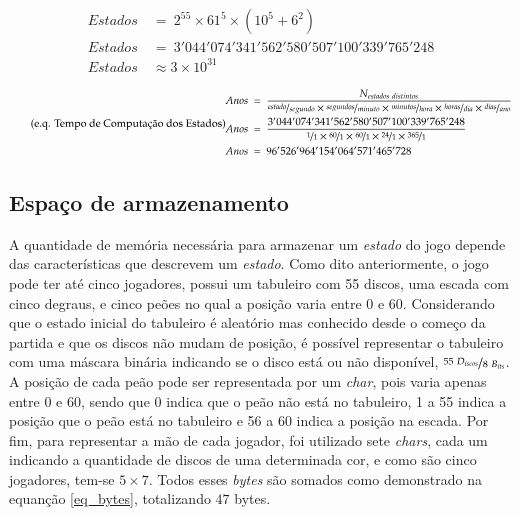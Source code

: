 \begin{equation} \label{eq_estados} \tag{e.q. Caso Geral}
\begin{split}
Estados\ &=\ 2^{55}\times 61^{5}\times (10^{5} + 6^{2})\\
Estados\ &=\ 3'044'074'341'562'580'507'100'339'765'248\\
Estados\ &\approx 3\times 10^{31}
\end{split}
\end{equation}

\begin{equation} \label{eq_anos_estados} \tag{e.q. Tempo de Computação dos Estados}
\begin{split}
Anos\ &=\ \dfrac{N_{estados\ distintos}}{\nicefrac{estado}{segundo}\times\nicefrac{segundos}{minuto}\times\nicefrac{minutos}{hora}\times\nicefrac{horas}{dia}\times\nicefrac{dias}{ano}}\\
Anos\ &=\ \dfrac{3'044'074'341'562'580'507'100'339'765'248}{\nicefrac{1}{1}\times\nicefrac{60}{1}\times\nicefrac{60}{1}\times\nicefrac{24}{1}\times\nicefrac{365}{1}}\\
Anos\ &=\ 96'526'964'154'064'571'465'728
\end{split}
\end{equation}

\subsection{Espaço de armazenamento}

A quantidade de memória necessária para armazenar um \emph{estado} do jogo depende das características que descrevem um \emph{estado}. Como dito anteriormente, o jogo pode ter até cinco jogadores, possui um tabuleiro com 55 discos, uma escada com cinco degraus, e cinco peões no qual a posição varia entre 0 e 60. Considerando que o estado inicial do tabuleiro é aleatório mas conhecido desde o começo da partida e que os discos não mudam de posição, é possível representar o tabuleiro com uma máscara binária indicando se o disco está ou não disponível, $\nicefrac{55\ D_{iscos}}{8\ B_{its}}$. A posição de cada peão pode ser representada por um \emph{char}, pois varia apenas entre 0 e 60, sendo que 0 indica que o peão não está no tabuleiro, 1 a 55 indica a posição que o peão está no tabuleiro e 56 a 60 indica a posição na escada. Por fim, para representar a mão de cada jogador, foi utilizado sete \emph{chars}, cada um indicando a quantidade de discos de uma determinada cor, e como são cinco jogadores, tem-se $5\times 7$. Todos esses \emph{bytes} são somados como demonstrado na equanção \ref{eq_bytes}, totalizando $47$ bytes.

